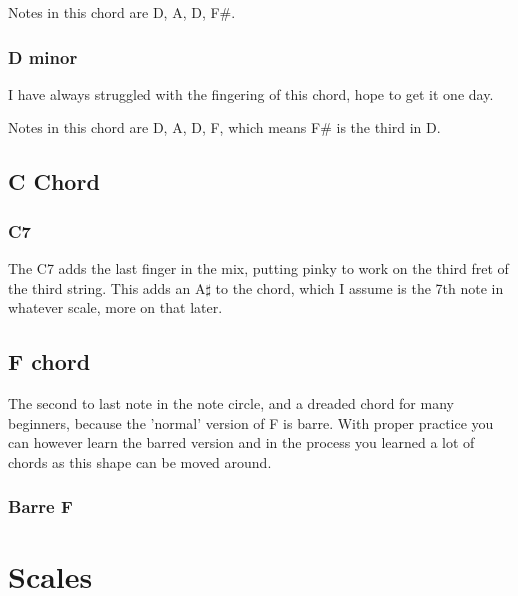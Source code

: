 \documentclass[11pt]{book}
\begin{document}
    \chordscheme[
    name = D,
    finger = {2/3:1, 3/2:3, 2/1:2},
    ring = {4},
    mute = {6,5}
    ]

    Notes in this chord are D, A, D, F\#.

    \subsection{D minor}
    I have always struggled with the fingering of this chord, hope to get it one day.

    \chordscheme[
    name = Dm,
    finger = {2/3:2, 3/2:3, 1/1:1},
    ring = {4},
    mute = {5,6}
    ]

    Notes in this chord are D, A, D, F, which means F\# is the third in D.


    \section{C Chord}

    \subsection{C7}
    The C7 adds the last finger in the mix, putting pinky to work on the third fret of the third string.
    This adds an A$\sharp$ to the chord, which I assume is the 7th note in whatever scale, more on that later.

    \chordscheme[
    name = C7,
    mute = {6},
    finger = {3/5:3, 2/4:2, 3/3:4, 1/2:1},
    ring = {1}
    ]


    \section{F chord}
    The second to last note in the note circle, and a dreaded chord for many beginners, because the 'normal' version of
    F is barre.
    With proper practice you can however learn the barred version and in the process you learned a lot of chords as this shape can be moved around.

    \subsection{Barre F}

    \chordscheme[
    name = F,
    finger = {3/5:4,3/4:4,2/3:2},
    barre = {1/1-6:1}
    ]


    \chapter{Scales}
\end{document}
